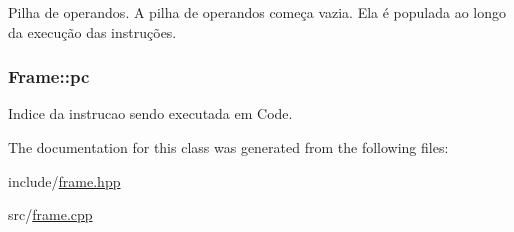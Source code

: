 Pilha de operandos. A pilha de operandos começa vazia. Ela é populada ao longo da execução das instruções. 

\hypertarget{classFrame_a65edf2210e6653b9acbdc58240040104}{
\subsubsection[{pc}]{\setlength{\rightskip}{0pt plus 5cm}Frame\+::pc}}\label{classFrame_a65edf2210e6653b9acbdc58240040104}


Indice da instrucao sendo executada em Code. 



The documentation for this class was generated from the following files\+:\begin{DoxyCompactItemize}
\item 
include/\hyperlink{frame_8hpp}{frame.\+hpp}\item 
src/\hyperlink{frame_8cpp}{frame.\+cpp}\end{DoxyCompactItemize}
